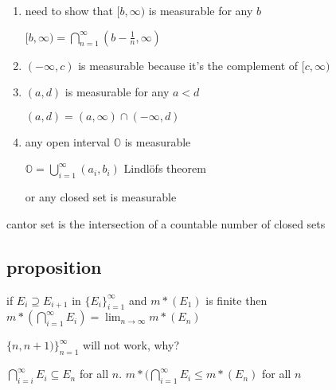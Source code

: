 \documentclass[letterpaper]{article}
\begin{document}
\begin{enumerate}
\item
need to show that $[b,\infty)$ is measurable for any $b$

$[b,\infty)=\bigcap_{n=1}^\infty(b-\frac{1}{n},\infty)$
\item
$(-\infty,c)$ is measurable because it's the complement of $[c,\infty)$
\item
$(a,d)$ is measurable for any $a<d$

$(a,d)=(a,\infty)\cap(-\infty,d)$
\item
any open interval $\mathbb{O}$ is measurable

$\mathbb{O}=\bigcup_{i=1}^\infty(a_i,b_i)$
Lindlöfs theorem

or any closed set is measurable
\end{enumerate}

cantor set is the intersection of a countable number of closed sets

\subsection*{proposition}
if $E_i\supseteq E_{i+1}$ in $\{E_i\}_{i=1}^\infty$ and $m*(E_1)$ is finite then $m*(\bigcap_{i=1}^\infty E_i)=\lim_{n\to\infty}m*(E_n)$ 

$\{n,n+1)\}_{n=1}^\infty$ will not work, why?

$\bigcap_{i=i}^\infty E_i\subseteq E_n$ for all $n$. $m*(\bigcap_{i=1}^\infty E_i\le m*(E_n)$ for all $n$
\end{document}
